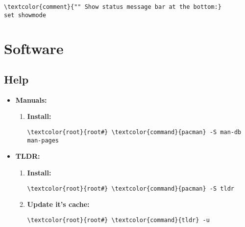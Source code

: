 \documentclass[10pt, a4paper, onecolumn, openany]{book} %
\begin{document}
\begin{enumerate}
\begin{enumerate}
\begin{Verbatim}[commandchars=\\\{\}]
\textcolor{comment}{"" Show status message bar at the bottom:}
set showmode
\end{Verbatim}
\end{enumerate}


\end{enumerate}


\chapter{Software}
\section{Help}
\begin{itemize}
    \item \textbf{Manuals:}
    \begin{enumerate}
        \item \textbf{Install:}
\begin{Verbatim}[commandchars=\\\{\}]
\textcolor{root}{root#} \textcolor{command}{pacman} -S man-db man-pages
\end{Verbatim}
    \end{enumerate}

    \item \textbf{TLDR:}
    \begin{enumerate}
        \item \textbf{Install:}
\begin{Verbatim}[commandchars=\\\{\}]
\textcolor{root}{root#} \textcolor{command}{pacman} -S tldr
\end{Verbatim}
        \item \textbf{Update it's cache:}
\begin{Verbatim}[commandchars=\\\{\}]
\textcolor{root}{root#} \textcolor{command}{tldr} -u
\end{Verbatim}
    \end{enumerate}

\end{itemize}

\end{document}
